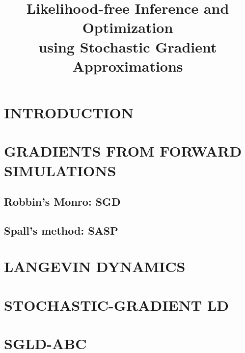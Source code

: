 \documentclass[]{article}
\date{}
\title{Likelihood-free Inference and Optimization \\ using Stochastic Gradient Approximations}
\author{} %
\begin{document}
 
	\vskip -0.3in
  
\maketitle

% 
% 
% 
\begin{abstract} 
%
\end{abstract} 

\section{INTRODUCTION} \label{introduction}


\section{GRADIENTS FROM FORWARD SIMULATIONS} \label{gradsforward}

\subsection{Robbin's Monro: SGD}

\subsection{Spall's method: SASP}

\section{LANGEVIN DYNAMICS} \label{ld}


\section{STOCHASTIC-GRADIENT LD} \label{sgld}

\section{SGLD-ABC} \label{sgld}
\end{document}
